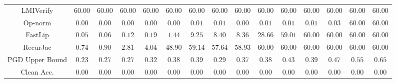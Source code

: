 \begin{table*}
{\begin{tabular}{c|c|c|c|c|c|c|c|c|c|c|c|c|c|c}
    LMIVerify &       $60.00$ &       $60.00$ &       $60.00$ &       $60.00$ &       $60.00$ &       $60.00$ &       $60.00$ &       $60.00$ &       $60.00$ &       $60.00$ &       $60.00$ &       $60.00$ &       $60.00$ &       $60.00$ \\
      Op-norm &        $0.00$ &        $0.00$ &        $0.00$ &        $0.00$ &        $0.00$ &        $0.01$ &        $0.01$ &        $0.00$ &        $0.01$ &        $0.01$ &        $0.01$ &        $0.03$ &       $60.00$ &       $60.00$ \\
      FastLip &        $0.05$ &        $0.06$ &        $0.12$ &        $0.19$ &        $1.44$ &        $9.25$ &        $8.40$ &        $8.36$ &       $28.66$ &       $59.01$ &       $60.00$ &       $60.00$ &       $60.00$ &       $60.00$ \\
     RecurJac &        $0.74$ &        $0.90$ &        $2.81$ &        $4.04$ &       $48.90$ &       $59.14$ &       $57.64$ &       $58.93$ &       $60.00$ &       $60.00$ &       $60.00$ &       $60.00$ &       $60.00$ &       $60.00$ \\
\hline
PGD Upper Bound &        $0.23$ &        $0.27$ &        $0.27$ &        $0.32$ &        $0.38$ &        $0.39$ &        $0.29$ &        $0.37$ &        $0.38$ &        $0.43$ &        $0.39$ &        $0.47$ &        $0.55$ &        $0.65$ \\
\hline
   Clean Acc. &        $0.00$ &        $0.00$ &        $0.00$ &        $0.00$ &        $0.00$ &        $0.00$ &        $0.00$ &        $0.00$ &        $0.00$ &        $0.00$ &        $0.00$ &        $0.00$ &        $0.00$ &        $0.00$ \\
\bottomrule

    \end{tabular}
    }
    \label{tab:exp-A-cifar10-verify-time}
\end{table*}

